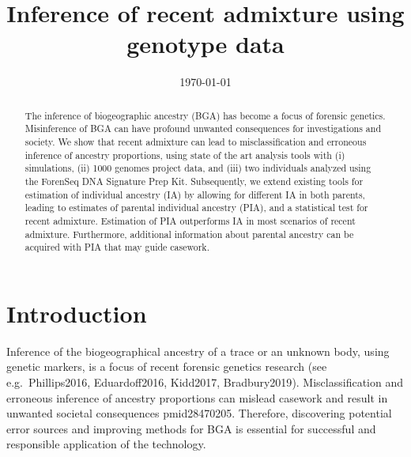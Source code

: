 \documentclass[12pt]{article}
\theoremstyle{definition}
\begin{document}
\title{\LARGE Inference of recent admixture using genotype data}


\date{\today}

\maketitle

\begin{abstract}
  \noindent
 The inference of biogeographic ancestry (BGA) has become a focus of forensic genetics. Misinference of BGA can have profound unwanted consequences for investigations and society. We show that recent admixture can lead to misclassification and erroneous inference of ancestry proportions, using state of the art analysis tools with (i) simulations, (ii) 1000 genomes project data, and (iii) two individuals analyzed using the ForenSeq DNA Signature Prep Kit. Subsequently, we extend existing tools for estimation of individual ancestry (IA) by allowing for different IA in both parents, leading to estimates of parental individual ancestry (PIA), and a statistical test for recent admixture. Estimation of PIA outperforms IA in most scenarios of recent admixture. Furthermore, additional information about parental ancestry can be acquired with PIA that may guide casework.
 \end{abstract}




\section{Introduction}
Inference of the biogeographical ancestry of a trace or an unknown body, using genetic markers, is a focus of recent forensic genetics research (see e.g.\ \cite{article}{Phillips2016, Eduardoff2016, Kidd2017, Bradbury2019}). Misclassification and erroneous inference of ancestry proportions can mislead casework and result in unwanted societal consequences \cite{article}{pmid28470205}. Therefore, discovering potential error sources and improving methods for BGA is essential for successful and responsible application of the technology.
\end{document}
